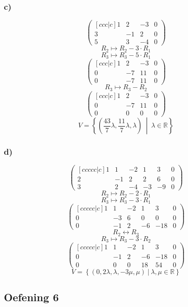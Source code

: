 \documentclass[lineaire_algebra_oplossingen.tex]{subfiles}
\begin{document}
\subsubsection*{c)}
\[
\begin{pmatrix}[ccc|c]
1 &  2 &  -3 & 0\\
3 &  -1 &  2 & 0\\
5 &  3 &  -4 & 0
\end{pmatrix}
\]
\[ R_2 \longmapsto R_2 -3\cdot R_1\]
\[ R_3 \longmapsto R_3 -5\cdot R_1\]
\[
\begin{pmatrix}[ccc|c]
1 &   2 &  -3 & 0\\
0 &  -7 &  11 & 0\\
0 &  -7 &  11 & 0
\end{pmatrix}
\]
\[ R_3 \longmapsto R_3 - R_2\]
\[
\begin{pmatrix}[ccc|c]
1 &  2 &  -3 & 0\\
0 & -7 &  11 & 0\\
0 &  0 &  0  & 0
\end{pmatrix}
\]
\[
V = \left\{\left( \frac{43}{7}\lambda,\frac{11}{7}\lambda,\lambda \right)\ \middle|\  \lambda\in\mathbb{R} \right\}
\]
\subsubsection*{d)}
\[
\begin{pmatrix}[ccccc|c]
1 &  1 &  -2 & 1 & 3 & 0\\
2 &  -1 &  2 & 2 & 6 & 0\\
3 &  2 &  -4 & -3 & -9 & 0
\end{pmatrix}
\]
\[ R_2 \longmapsto R_2 -2\cdot R_1\]
\[ R_3 \longmapsto R_3 -3\cdot R_1\]
\[
\begin{pmatrix}[ccccc|c]
1 &  1 &  -2 & 1 & 3 & 0\\
0 &  -3 &  6 & 0 & 0 & 0\\
0 &  -1 &  2 & -6 & -18 & 0
\end{pmatrix}
\]
\[ R_2 \leftrightarrow R_3\]
\[ R_3 \longmapsto R_3 -3\cdot R_2\]
\[
\begin{pmatrix}[ccccc|c]
1 &  1 &  -2 & 1 & 3 & 0\\
0 &  -1 &  2 & -6 & -18 & 0\\
0 &  0 &  0 & 18 & 54 & 0
\end{pmatrix}
\]
\[
V = 
\left\{ 
\left( 0,2\lambda,\lambda,-3\mu,\mu  \right)
\ |\ \lambda,\mu\in\mathbb{R}
\right\}
\]

\subsection{Oefening 6}
\end{document}
